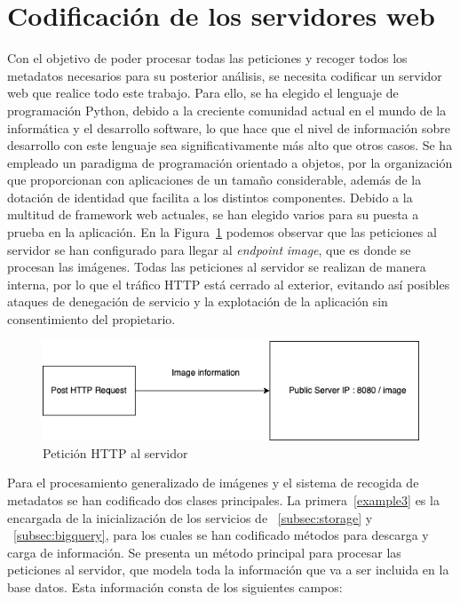 \section{Codificación de los servidores web}\label{sec:codificación-de-los-servidores-web}
Con el objetivo de poder procesar todas las peticiones y recoger todos los metadatos necesarios para su posterior análisis, se necesita codificar un servidor web que realice todo este trabajo.
Para ello, se ha elegido el lenguaje de programación Python, debido a la creciente comunidad actual en el mundo de la informática y el desarrollo software, lo que hace que el nivel de información sobre desarrollo con este lenguaje sea significativamente más alto que otros casos.
Se ha empleado un paradigma de programación orientado a objetos, por la organización que proporcionan con aplicaciones de un tamaño considerable, además de la dotación de identidad que facilita a los distintos componentes. Debido a la multitud de framework web actuales, se han elegido varios para su puesta a prueba en la aplicación.
En la Figura~\ref{fig:Petición HTTP al servidor} podemos observar que las peticiones al servidor se han configurado para llegar al \textit{endpoint} \textit{image}, que es donde se procesan las imágenes.
Todas las peticiones al servidor se realizan de manera interna, por lo que el tráfico HTTP está cerrado al exterior, evitando así posibles ataques de denegación de servicio y la explotación de la aplicación sin consentimiento del propietario.

\begin{figure}
    \centering
    \includegraphics[width=1.0\textwidth]{images/chapter4/http_request.png}
    \caption{Petición HTTP al servidor}
    \label{fig:Petición HTTP al servidor}
\end{figure}

Para el procesamiento generalizado de imágenes y el sistema de recogida de metadatos se han codificado dos clases principales.
La primera~\ref{example3} es la encargada de la inicialización de los servicios de ~\ref{subsec:storage} y ~\ref{subsec:bigquery}, para los cuales se han codificado métodos para descarga y carga de información.
Se presenta un método principal para procesar las peticiones al servidor, que modela toda la información que va a ser incluida en la base datos.
Esta información consta de los siguientes campos:

